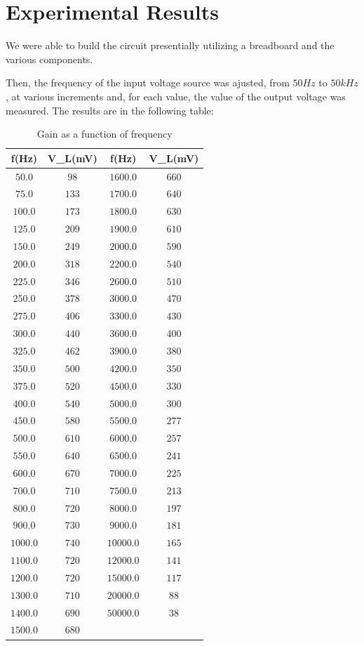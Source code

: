 \section{Experimental Results}
\label{sec:lab}

We were able to build the circuit presentially utilizing a breadboard and the various components.

Then, the frequency of the input voltage source was ajusted, from $50 Hz$ to $50 kHz$, at various increments and, for each value, the value of the output voltage was measured.
The results are in the following table:

\begin{table}
    \caption{Gain as a function of frequency}
    \vspace{-3mm}
    \begin{tabular}{|c|c|c|c|}
    \hline
    f(Hz) &  V_L(mV) & f(Hz) &  V_L(mV)\\
    \hline 
    $50.0$  &   $98$  & $1600.0$ &  $660$\\
    $75.0$  &   $133$ & $1700.0$ &  $640$\\
    $100.0$ &  $173$  & $1800.0$ &  $630$\\
    $125.0$ &  $209$  & $1900.0$ &  $610$\\
    $150.0$ &  $249$  & $2000.0$ &  $590$\\
    $200.0$ &  $318$  & $2200.0$ &  $540$\\
    $225.0$ &  $346$  & $2600.0$ &  $510$\\
    $250.0$ &  $378$  & $3000.0$ &  $470$\\
    $275.0$ &  $406$  & $3300.0$ &  $430$\\
    $300.0$ &  $440$  & $3600.0$ &  $400$\\
    $325.0$ &  $462$  & $3900.0$ &  $380$\\
    $350.0$ &  $500$  & $4200.0$ &  $350$\\
    $375.0$ &  $520$  & $4500.0$ &  $330$\\
    $400.0$ &  $540$  & $5000.0$ &  $300$\\
    $450.0$ &  $580$  & $5500.0$ &  $277$\\
    $500.0$ &  $610$  & $6000.0$ &  $257$\\
    $550.0$ &  $640$  & $6500.0$ &  $241$\\
    $600.0$ &  $670$  & $7000.0$ &  $225$\\
    $700.0$ &  $710$  & $7500.0$ &  $213$\\
    $800.0$ &  $720$  & $8000.0$ &  $197$\\
    $900.0$ &  $730$  & $9000.0$ &  $181$\\
    $1000.0$ &  $740$ & $10000.0$&  $165$\\
    $1100.0$ &  $720$ & $12000.0$&  $141$\\
    $1200.0$ &  $720$ & $15000.0$&  $117$\\
    $1300.0$ &  $710$ & $20000.0$ &  $88$\\
    $1400.0$ &  $690$ & $50000.0$ &  $38$\\
    $1500.0$ &  $680$ & &\\


\end{tabular}
\end{table}
